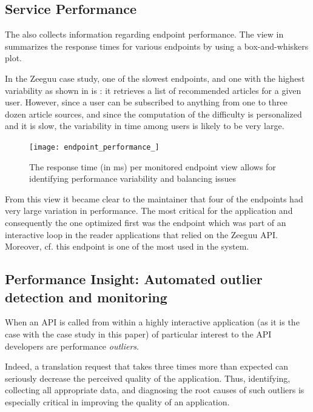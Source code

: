 
\subsection{Service Performance}
\label{sec:perf}


  The \tool also collects information regarding endpoint performance. The view in  summarizes the response times for various endpoints by using a box-and-whiskers plot. 

In the Zeeguu case study, one of the slowest endpoints, and one with the highest variability as shown in  is \epFeedItems: it retrieves a list of recommended articles for a given user. However, since a user can be subscribed to anything from one to three dozen article sources, and since the computation of the difficulty is personalized and it is slow, the variability in time among users is likely to be very large. 


 \begin{figure}[!ht]
   \centering
   \texttt{[image: endpoint\_performance\_]}
   \caption{The response time (in ms) per monitored endpoint view allows for identifying performance variability and balancing issues}
   \label{fig:ep}
 \end{figure}

  From this view it became clear to the maintainer that four of the endpoints had very large variation in performance.   The most critical for the application and consequently the one optimized first was the \epTranslations endpoint which was part of an interactive loop in the reader applications that relied on the Zeeguu API. Moreover, cf.  this endpoint is one of the most used in the system.





  \newpage
  \subsection{Performance Insight: Automated outlier detection and monitoring}
  
  When an API is called from within a highly interactive application (as it is the case with the case study in this paper) 
  of particular interest to the API developers are performance {\em outliers}. 

  Indeed, a translation request that takes three times more than expected can seriously decrease the perceived quality of the application. Thus, identifying, collecting all appropriate data, and diagnosing the root causes of such outliers is especially critical in improving the quality of an application. 
  
